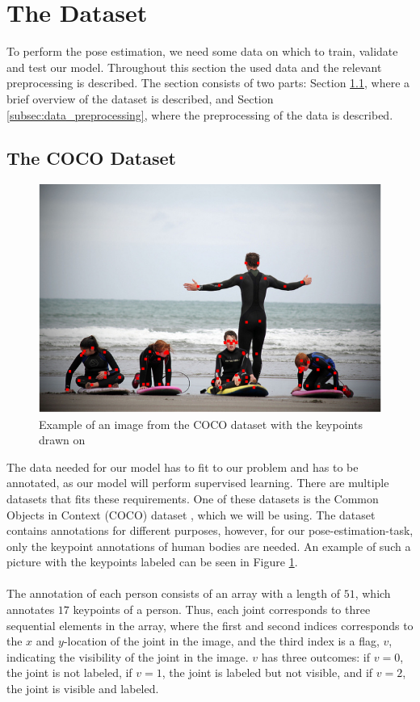 \documentclass[./main.tex]{subfiles}
\begin{document}
\section{The Dataset}\label{sec:dataset}
To perform the pose estimation, we need some data on which to train, validate and test our model. Throughout this section the used data and the relevant preprocessing is described. The section consists of two parts: Section \ref{subsec:COCO}, where a brief overview of the dataset is described, and Section \ref{subsec:data_preprocessing}, where the preprocessing of the data is described. 

\subsection{The COCO Dataset}\label{subsec:COCO}
\begin{figure}[htbp]
    \centering
    \includegraphics[height = 4 cm]{./entities/coco_example.png}
    \caption{Example of an image from the COCO dataset with the keypoints drawn on \cite{COCO_article}}
    \label{fig:coco_example}
\end{figure}
\noindent The data needed for our model has to fit to our problem and has to be annotated, as our model will perform supervised learning. There are multiple datasets that fits these requirements. One of these datasets is the Common Objects in Context (COCO) dataset \cite{COCO_article}, which we will be using. The dataset contains annotations for different purposes, however, for our pose-estimation-task, only the keypoint annotations of human bodies are needed. An example of such a picture with the keypoints labeled can be seen in Figure \ref{fig:coco_example}. 
\\
\\
The annotation of each person consists of an array with a length of $51$, which annotates $17$ keypoints of a person. Thus, each joint corresponds to three sequential elements in the array, where the first and second indices corresponds to the $x$ and $y$-location of the joint in the image, and the third index is a flag, $v$, indicating the visibility of the joint in the image. $v$ has three outcomes: if $v = 0$, the joint is not labeled, if $v = 1$, the joint is labeled but not visible, and if $v = 2$, the joint is visible and labeled. 
\end{document}
